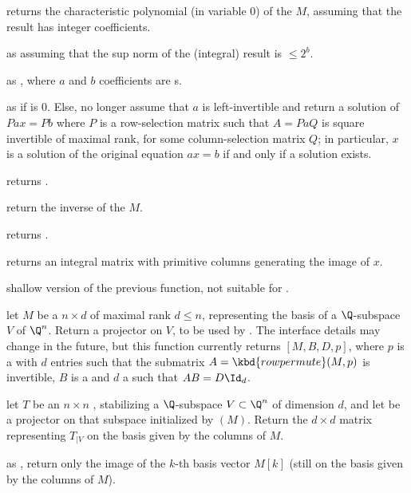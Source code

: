 
 returns the characteristic polynomial
(in variable $0$) of the  $M$, assuming that the result has integer
coefficients.

 as 
assuming that the sup norm of the (integral) result is $\leq 2^b$.

 as , where $a$ and $b$
coefficients are s.

 as  if
 is $0$. Else, no longer assume that $a$ is left-invertible and
return a solution of $P a x = P b$ where $P$ is a row-selection matrix
such that $A = P a Q$ is square invertible of maximal rank, for some
column-selection matrix $Q$; in particular, $x$ is a solution of
the original equation $a x = b$ if and only if a solution exists.

 returns .

 return the inverse of the  $M$.

 returns .

 returns an integral matrix with primitive columns
generating the image of $x$.

 shallow version of the previous function,
not suitable for .


 let $M$ be a  $n\times d$  of
maximal rank $d \leq n$, representing the basis of a $\Q$-subspace
$V$ of $\Q^n$. Return a projector on $V$, to be used by .
The interface details may change in the future, but this function currently
returns $[M, B,D,p]$, where $p$ is a  with $d$ entries
such that the submatrix $A = \kbd{rowpermute}(M,p)$ is invertible, $B$ is a
 and $d$ a  such that $A B = D \Id_d$.

 let $T$ be an $n\times n$
, stabilizing a $\Q$-subspace $V\subset \Q^n$ of dimension $d$, and
let  be a projector on that subspace initialized by
$(M)$. Return the $d\times d$ matrix representing $T_{|V}$
on the basis given by the columns of $M$.

 as
, return only the image of the $k$-th basis vector $M[k]$
(still on the basis given by the columns of $M$).

